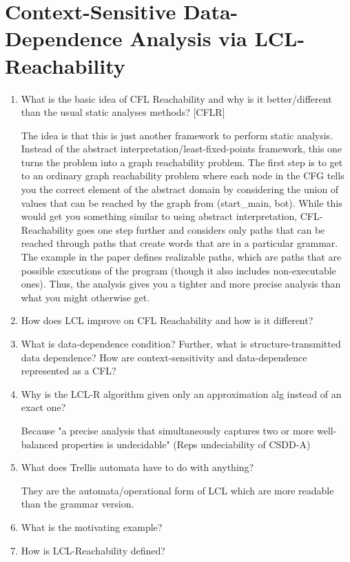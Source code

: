 \documentclass[12pt]{article}
\theoremstyle{remark}
\theoremstyle{remark}
\begin{document}
\section{Context-Sensitive Data-Dependence Analysis via LCL-Reachability}
\begin{enumerate}
  \item What is the basic idea of CFL Reachability and why is it better/different than the usual static analyses methods? [CFLR]
  
  The idea is that this is just another framework to perform static analysis. Instead of the abstract interpretation/least-fixed-points framework, this one turns the problem into a graph reachability problem. The first step is to get to an ordinary graph reachability problem where each node in the CFG tells you the correct element of the abstract domain by considering the union of values that can be reached by the graph from (start\_main, bot). While this would get you something similar to using abstract interpretation, CFL-Reachability goes one step further and considers only paths that can be reached through paths that create words that are in a particular grammar. The example in the paper defines realizable paths, which are paths that are possible executions of the program (though it also includes non-executable ones). Thus, the analysis gives you a tighter and more precise analysis than what you might otherwise get.
  \item How does LCL improve on CFL Reachability and how is it different?
  \item What is data-dependence condition? Further, what is structure-transmitted data dependence? How are context-sensitivity and data-dependence represented as a CFL?
  \item Why is the LCL-R algorithm given only an approximation alg instead of an exact one?
  
  Because "a precise analysis that simultaneously captures two or more well-balanced properties is undecidable" (Reps undeciability of CSDD-A)

  \item What does Trellis automata have to do with anything?
  
  They are the automata/operational form of LCL which are more readable than the grammar version.

  \item What is the motivating example?
  \item How is LCL-Reachability defined?
  

\end{enumerate}
\end{document}
